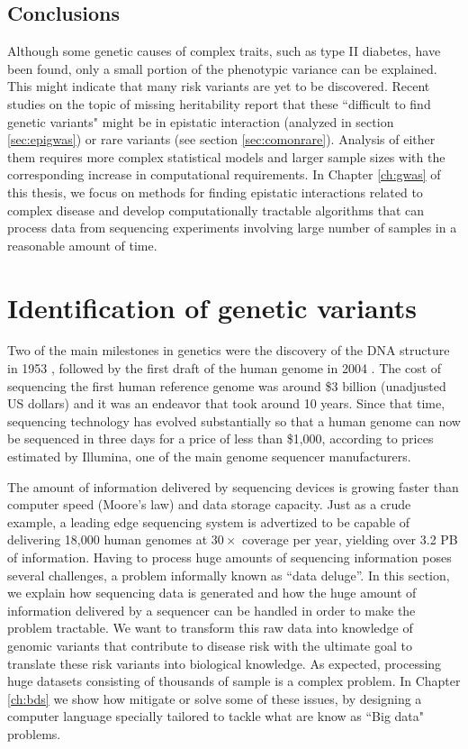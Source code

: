 \subsection{Conclusions}

Although some genetic causes of complex traits, such as type II diabetes, have been found, only a small portion of the phenotypic variance can be explained. This might indicate that many risk variants are yet to be discovered. Recent studies on the topic of missing heritability report that these ``difficult to find genetic variants" might be in epistatic interaction (analyzed in section \ref{sec:epigwas}) or rare variants (see section \ref{sec:comonrare}). Analysis of either them requires more complex statistical models and larger sample sizes with the corresponding increase in computational requirements. In Chapter \ref{ch:gwas} of this thesis, we focus on methods for finding epistatic interactions related to complex disease and develop computationally tractable algorithms that can process data from sequencing experiments involving large number of samples in a reasonable amount of time.

\section{Identification of genetic variants}

Two of the main milestones in genetics were the discovery of the DNA structure in 1953 \cite{watson1953molecular}, followed by the first draft of the human genome in 2004 \cite{collins2004finishing}. The cost of sequencing the first human reference genome was around \$3 billion (unadjusted US dollars) and it was an endeavor that took around 10 years. Since that time, sequencing technology has evolved substantially so that a human genome can now be sequenced in three days for a price of less than \$1,000, according to prices estimated by Illumina, one of the main genome sequencer manufacturers.

The amount of information delivered by sequencing devices is growing faster than computer speed (Moore's law) and data storage capacity. Just as a crude example, a leading edge sequencing system is advertized to be capable of delivering 18,000 human genomes at $30 \times$ coverage per year, yielding over 3.2 PB of information. Having to process huge amounts of sequencing information poses several challenges, a problem informally known as ``data deluge''. In this section, we explain how sequencing data is generated and how the huge amount of information delivered by a sequencer can be handled in order to make the problem tractable. We want to transform this raw data into knowledge of genomic variants that contribute to disease risk with the ultimate goal to translate these risk variants into biological knowledge. As expected, processing huge datasets consisting of thousands of sample is a complex problem. In Chapter \ref{ch:bds} we show how mitigate or solve some of these issues, by designing a computer language specially tailored to tackle what are know as ``Big data" problems.

